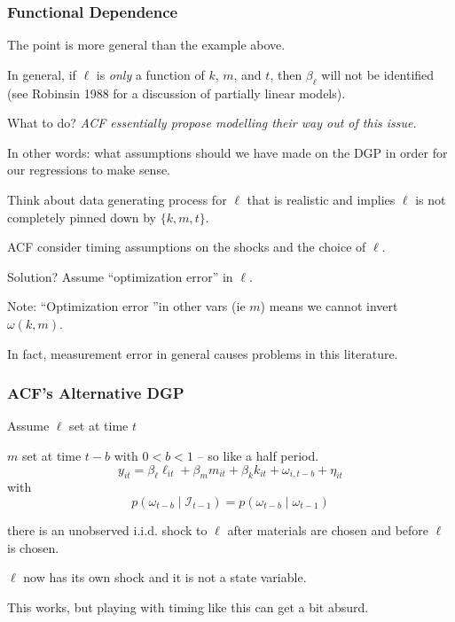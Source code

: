 \documentclass[11pt, aspectratio=169]{beamer}
\newcommand{\Skip}{\vspace{1em}}
\newenvironment{wideitemize}{\itemize\addtolength{\itemsep}{10pt}}{\enditemize}
\begin{document}
\begin{frame}[c]\frametitle{Functional Dependence}

The point is more general than the example above. 
\begin{wideitemize}
	\item In general, if $\ell$ is \emph{only} a function of $k$, $m$, and $t$, then $\beta_{\ell}$ will not be identified (see Robinsin 1988 for a discussion of partially linear models). 
\end{wideitemize}

\bigskip
What to do? \emph{ACF essentially propose modelling their way out of this issue.}

\Skip
In other words: what assumptions should we have made on the DGP in order for our regressions to make sense.
\begin{wideitemize}
	\item Think about data generating process for $\ell$ that is realistic and implies $\ell$ is not completely pinned down by $\{k,m,t\}$.
	\item ACF consider timing assumptions on the shocks and the choice of $\ell$.
	\item Solution? Assume ``optimization error'' in $\ell$.
	\begin{wideitemize}
		\item Note: ``Optimization error ''in other vars (ie $m$) means we cannot invert $\omega(k,m)$.
		\item In fact, measurement error in general causes problems in this literature. 
	\end{wideitemize}
	
\end{wideitemize}


\end{frame}


\begin{frame}[c]\frametitle{ACF's Alternative DGP}
    
\begin{wideitemize}
	\item Assume $\ell$ set at time $t$
	\item $m$ set at time $t-b$ with $0<b<1$ -- so like a half period.
	$$y_{it} = \beta_{\ell} \ell_{it} + \beta_m m_{it} + \beta_k k_{it} + \omega_{i,t-b} + \eta_{it}$$
	with 
	$$p(\omega_{t-b}\mid \mathcal{I}_{t-1}) = p(\omega_{t-b}\mid\omega_{t-1})$$
	\item there is an unobserved i.i.d. shock to $\ell$ after materials are chosen and before $\ell$ is chosen. 
	\item $\ell$ now has its own shock and it is not a state variable. 
	\item This works, but playing with timing like this can get a bit absurd. 
\end{wideitemize}
    

\end{frame}
\end{document}

